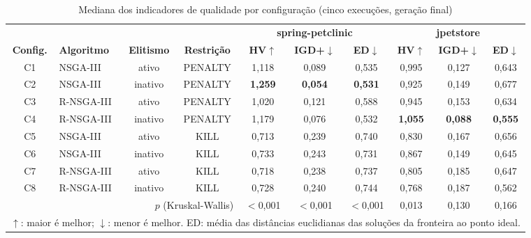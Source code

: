 \documentclass[conference]{IEEEtran}
\begin{document}
\begin{table}[t]
\caption{Mediana dos indicadores de qualidade por configuração (cinco execuções, geração final)}
\label{tab:indicadores}
\centering
\footnotesize
\begin{tabular}{c|lcc|ccc|ccc}
\hline
 & & & & \multicolumn{3}{c|}{\textbf{spring-petclinic}} & \multicolumn{3}{c}{\textbf{jpetstore}} \\
\textbf{Config.} & \textbf{Algoritmo} & \textbf{Elitismo} & \textbf{Restrição} & \textbf{HV}$\uparrow$ & \textbf{IGD+}$\downarrow$ & \textbf{ED}$\downarrow$ & \textbf{HV}$\uparrow$ & \textbf{IGD+}$\downarrow$ & \textbf{ED}$\downarrow$ \\
\hline
C1 & NSGA-III   & ativo   & PENALTY & 1,118 & 0,089 & 0,535 & 0,995 & 0,127 & 0,643 \\
C2 & NSGA-III   & inativo & PENALTY & \textbf{1,259} & \textbf{0,054} & \textbf{0,531} & 0,925 & 0,149 & 0,677 \\
C3 & R-NSGA-III & ativo   & PENALTY & 1,020 & 0,121 & 0,588 & 0,945 & 0,153 & 0,634 \\
C4 & R-NSGA-III & inativo & PENALTY & 1,179 & 0,076 & 0,532 & \textbf{1,055} & \textbf{0,088} & \textbf{0,555} \\
\hline
C5 & NSGA-III   & ativo   & KILL & 0,713 & 0,239 & 0,740 & 0,830 & 0,167 & 0,656 \\
C6 & NSGA-III   & inativo & KILL & 0,733 & 0,243 & 0,731 & 0,867 & 0,149 & 0,645 \\
C7 & R-NSGA-III & ativo   & KILL & 0,718 & 0,238 & 0,737 & 0,805 & 0,185 & 0,647 \\
C8 & R-NSGA-III & inativo & KILL & 0,728 & 0,240 & 0,744 & 0,768 & 0,187 & 0,562 \\
\hline
\multicolumn{4}{r|}{$p$ (Kruskal-Wallis)} & $<$0,001 & $<$0,001 & $<$0,001 & 0,013 & 0,130 & 0,166 \\
\hline
\multicolumn{10}{l}{\scriptsize $\uparrow$: maior é melhor; $\downarrow$: menor é melhor. ED: média das distâncias euclidianas das soluções da fronteira ao ponto ideal.}
\end{tabular}
\end{table}
\end{document}
